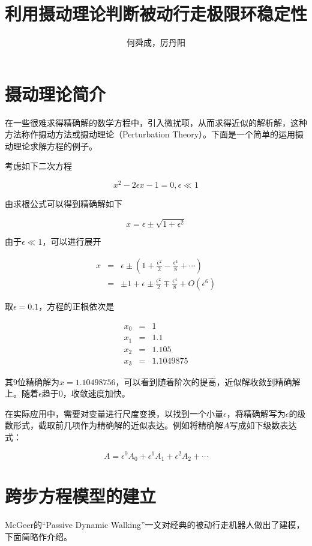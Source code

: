 \documentclass[UTF8]{ctexart}
\author{何舜成，厉丹阳}
\title{利用摄动理论判断被动行走极限环稳定性}
\begin{document}
\maketitle
\section{摄动理论简介}
在一些很难求得精确解的数学方程中，引入微扰项，从而求得近似的解析解，这种方法称作摄动方法或摄动理论（Perturbation Theory）。下面是一个简单的运用摄动理论求解方程的例子。\par
考虑如下二次方程\par
\begin{equation}
x^{2}-2\epsilon x-1=0, \epsilon\ll1
\end{equation}
\par
由求根公式可以得到精确解如下\par
\begin{equation}
x=\epsilon\pm\sqrt{1+\epsilon^{2}}
\end{equation}
\par
由于$\epsilon\ll1$，可以进行展开\par
\begin{eqnarray*}
x&=&\epsilon\pm(1+\frac{\epsilon^{2}}{2}-\frac{\epsilon^{4}}{8}+\cdots)\\
&=&\pm1+\epsilon\pm\frac{\epsilon^{2}}{2}\mp\frac{\epsilon^{4}}{8}+O(\epsilon^{6})
\end{eqnarray*}
\par
取$\epsilon=0.1$，方程的正根依次是\par
\begin{eqnarray*}
x_{0}&=&1\\
x_{1}&=&1.1\\
x_{2}&=&1.105\\
x_{3}&=&1.1049875
\end{eqnarray*}
\par
其9位精确解为$x=1.10498756$，可以看到随着阶次的提高，近似解收敛到精确解上。随着$\epsilon$趋于0，收敛速度加快。\par
在实际应用中，需要对变量进行尺度变换，以找到一个小量$\epsilon$，将精确解写为$\epsilon$的级数形式，截取前几项作为精确解的近似表达。例如将精确解$A$写成如下级数表达式：\par
\begin{equation*}
A=\epsilon^{0}A_{0}+\epsilon^{1}A_{1}+\epsilon^{2}A_{2}+\cdots
\end{equation*}
\section{跨步方程模型的建立}
McGeer的“Passive Dynamic Walking”一文对经典的被动行走机器人做出了建模，下面简略作介绍。\par
\end{document}
